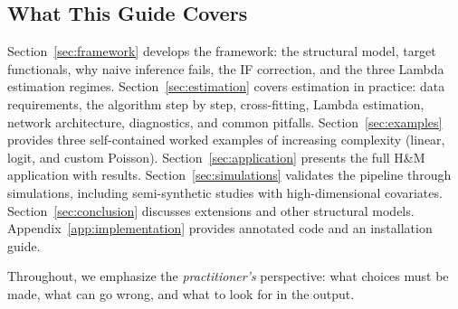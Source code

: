 \subsection{What This Guide Covers}

Section~\ref{sec:framework} develops the framework: the structural model, target functionals, why naive inference fails, the IF correction, and the three Lambda estimation regimes. Section~\ref{sec:estimation} covers estimation in practice: data requirements, the algorithm step by step, cross-fitting, Lambda estimation, network architecture, diagnostics, and common pitfalls. Section~\ref{sec:examples} provides three self-contained worked examples of increasing complexity (linear, logit, and custom Poisson). Section~\ref{sec:application} presents the full H\&M application with results. Section~\ref{sec:simulations} validates the pipeline through simulations, including semi-synthetic studies with high-dimensional covariates. Section~\ref{sec:conclusion} discusses extensions and other structural models. Appendix~\ref{app:implementation} provides annotated code and an installation guide.

Throughout, we emphasize the \emph{practitioner's} perspective: what choices must be made, what can go wrong, and what to look for in the output.
